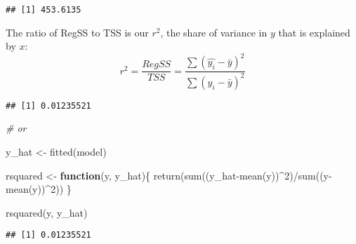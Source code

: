 \documentclass[
]{article}
\newenvironment{Shaded}{\begin{snugshade}}{\end{snugshade}}
\newcommand{\AttributeTok}[1]{\textcolor[rgb]{0.77,0.63,0.00}{#1}}
\newcommand{\CommentTok}[1]{\textcolor[rgb]{0.56,0.35,0.01}{\textit{#1}}}
\newcommand{\ControlFlowTok}[1]{\textcolor[rgb]{0.13,0.29,0.53}{\textbf{#1}}}
\newcommand{\DecValTok}[1]{\textcolor[rgb]{0.00,0.00,0.81}{#1}}
\newcommand{\FunctionTok}[1]{\textcolor[rgb]{0.00,0.00,0.00}{#1}}
\newcommand{\NormalTok}[1]{#1}
\newcommand{\OtherTok}[1]{\textcolor[rgb]{0.56,0.35,0.01}{#1}}
\newcommand{\SpecialCharTok}[1]{\textcolor[rgb]{0.00,0.00,0.00}{#1}}
\begin{document}
\begin{verbatim}
## [1] 453.6135
\end{verbatim}

The ratio of RegSS to TSS is our \(r^2\), the share of variance in \(y\)
that is explained by \(x\):
\[r^2=\frac{RegSS}{TSS}=\frac{\sum(\hat{y_i}-\bar{y})^2}{\sum(y_i-\bar{y})^2}\]

\begin{Shaded}
\end{Shaded}

\begin{verbatim}
## [1] 0.01235521
\end{verbatim}

\begin{Shaded}
\begin{Highlighting}[]
\CommentTok{\# or}

\NormalTok{y\_hat }\OtherTok{\textless{}{-}} \FunctionTok{fitted}\NormalTok{(model)}

\NormalTok{rsquared }\OtherTok{\textless{}{-}} \ControlFlowTok{function}\NormalTok{(y, y\_hat)\{}
  \FunctionTok{return}\NormalTok{(}\FunctionTok{sum}\NormalTok{((y\_hat}\SpecialCharTok{{-}}\FunctionTok{mean}\NormalTok{(y))}\SpecialCharTok{\^{}}\DecValTok{2}\NormalTok{)}\SpecialCharTok{/}\FunctionTok{sum}\NormalTok{((y}\SpecialCharTok{{-}}\FunctionTok{mean}\NormalTok{(y))}\SpecialCharTok{\^{}}\DecValTok{2}\NormalTok{))}
\NormalTok{\}}

\FunctionTok{rsquared}\NormalTok{(y, y\_hat)}
\end{Highlighting}
\end{Shaded}

\begin{verbatim}
## [1] 0.01235521
\end{verbatim}
\end{document}

